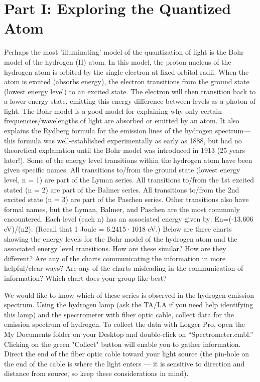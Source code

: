 \section*{Part I: Exploring the Quantized Atom}
Perhaps the most 'illuminating' model of the quantization of light is the Bohr model of the hydrogen (H) atom. 
In this model, the proton nucleus of the hydrogen atom is orbited by the single electron at fixed orbital radii. 
When the atom is excited (absorbs energy), the electron transitions from the ground state (lowest energy level) to an excited state. 
The electron will then transition back to a lower energy state, emitting this energy difference between levels as a photon of light. 
The Bohr model is a good model for explaining why only certain frequencies/wavelengths of light are absorbed or emitted by an atom. 
It also explains the Rydberg formula for the emission lines of the hydrogen spectrum—this formula was well-established experimentally as early as 1888, but had no theoretical explanation until the Bohr model was introduced in 1913 (25 years later!). 
Some of the energy level transitions within the hydrogen atom have been given specific names. 
All transitions to/from the ground state (lowest energy level, n = 1) are part of the Lyman series. 
All transitions to/from the 1st excited stated (n = 2) are part of the Balmer series. 
All transitions to/from the 2nd excited state (n = 3) are part of the Paschen series. 
Other transitions also have formal names, but the Lyman, Balmer, and Paschen are the most commonly encountered. 
Each level (each n) has an associated energy given by: En=(-13.606 eV)/(n2). 
(Recall that 1 Joule = 6.2415·1018 eV.) 
Below are three charts showing the energy levels for the Bohr model of the hydrogen atom and the associated energy level transitions. 
How are these similar? 
How are they different? 
Are any of the charts communicating the information in more helpful/clear ways? 
Are any of the charts misleading in the communication of information? 
Which chart does your group like best?
\par
We would like to know which of these series is observed in the hydrogen emission spectrum.
Using the hydrogen lamp (ask the TA/LA if you need help identifying this lamp) and the spectrometer with fiber optic cable, collect data for the emission spectrum of hydrogen. 
To collect the data with Logger Pro, open the My Documents folder on your Desktop and double-click on “Spectrometer.cmbl.” 
Clicking on the green "Collect" button will enable you to gather information.
Direct the end of the fiber optic cable toward your light source (the pin-hole on the end of the cable is where the light enters — it is sensitive to direction and distance from source, so keep these considerations in mind). 
